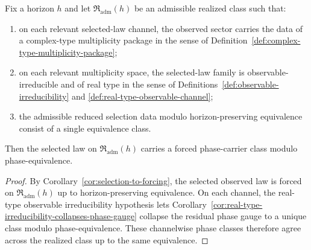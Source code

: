 \begin{corollary}
\label{cor:realized-phase-from-real-type}
Fix a horizon $h$ and let $\mathfrak R_{\mathrm{adm}}(h)$ be an admissible
realized class such that:
\begin{enumerate}[label=(\roman*), leftmargin=2em, itemsep=0.2em]
\item on each relevant selected-law channel, the observed sector carries the
      data of a complex-type multiplicity package in the sense of
      Definition~\ref{def:complex-type-multiplicity-package};
\item on each relevant multiplicity space, the selected-law family is
      observable-irreducible and of real type in the sense of
      Definitions~\ref{def:observable-irreducibility} and
      \ref{def:real-type-observable-channel};
\item the admissible reduced selection data modulo horizon-preserving
      equivalence consist of a single equivalence class.
\end{enumerate}
Then the selected law on $\mathfrak R_{\mathrm{adm}}(h)$ carries a forced
phase-carrier class modulo phase-equivalence.
\end{corollary}

\begin{proof}
By Corollary~\ref{cor:selection-to-forcing}, the selected observed law is
forced on $\mathfrak R_{\mathrm{adm}}(h)$ up to horizon-preserving
equivalence. On each channel, the real-type observable irreducibility
hypothesis lets
Corollary~\ref{cor:real-type-irreducibility-collapses-phase-gauge} collapse
the residual phase gauge to a unique class modulo phase-equivalence. These
channelwise phase classes therefore agree across the realized class up to the
same equivalence.
\end{proof}

